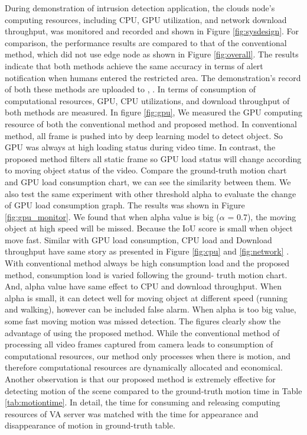 During demonstration of  intrusion detection application, the clouds node’s computing resources, including CPU, GPU utilization, and network download throughput, was monitored and recorded and shown in Figure \ref{fig:sysdesign}. For comparison, the performance results are compared to that of the conventional method, which did not use edge node as shown in Figure \ref{fig:overall}. The results indicate that both methods achieve the same accuracy in terms of alert notification when humans entered the restricted area. The demonstration's record of both these methods are uploaded to \cite{convential}, \cite{proposed}. In terms of consumption of computational resources, GPU, CPU utilizations, and download throughput of both methods are measured. In figure \ref{fig:gpu}, We measured the GPU computing resource of both the conventional
method and proposed method. In conventional method, all frame is pushed into by deep learning model to detect object. So GPU was always at high loading status during video time. In contrast, the proposed method filters all static frame so GPU load status will change according to moving object status of the video. Compare the ground-truth motion chart and GPU load consumption chart, we can see the similarity between them.
We also test the same experiment with other threshold alpha to
evaluate the change of GPU load consumption graph. The results was shown in Figure \ref{fig:gpu_monitor}. We found that when alpha value is big ($\alpha$ = 0.7), the moving object at high speed
will be missed. Because the IoU score is small when object move fast. 
Similar with GPU load consumption, CPU load and Download
throughput have same story as presented in Figure \ref{fig:cpu} and \ref{fig:network} . With conventional method always be high consumption load and the proposed method, consumption load is varied following the ground-
truth motion chart. And, alpha value have same effect to CPU and download throughput. When alpha is small, it can detect well for moving object at different speed (running and walking), however can be included false alarm.
When alpha is too big value, some fast moving motion was missed detection.
The figures clearly show the advantage of using the proposed method. While the conventional method of processing all video frames captured from camera leads to consumption of computational resources, our method only processes when there is motion, and therefore computational resources are dynamically allocated and economical. Another observation is that our proposed method is extremely effective for detecting motion of the scene compared to the ground-truth motion time in Table \ref{tab:motiontime}. In detail,  the time for consuming and releasing computing resources of VA server was matched with the time for appearance and disappearance of motion in ground-truth table. \\
